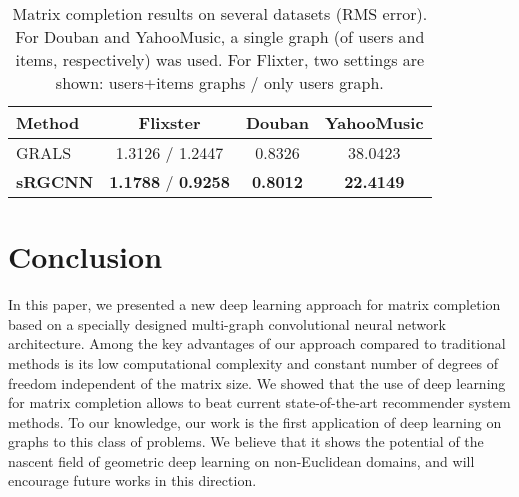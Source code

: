 \documentclass{article}
\begin{document}
\begin{table}[!h]
\caption{
Matrix completion results on several datasets (RMS error). For Douban and YahooMusic, a single graph (of users and items, respectively) was used. For Flixter, two settings are shown: users+items graphs / only users graph. \vspace{-2.25mm} 
}
\label{tab:other-datasets}
\vskip 0.15in
\begin{center}
\begin{small}
\begin{sc}
\begin{tabular}{lccc}
\hline
\abovespace\belowspace
Method & Flixster & Douban & YahooMusic \\
\hline
\abovespace 
GRALS & 1.3126 / 1.2447 & 0.8326 & 38.0423\\ 
{\bf sRGCNN} & {\bf 1.1788} / {\bf 0.9258} & {\bf 0.8012} & {\bf 22.4149} \\
\hline
\end{tabular}
\end{sc}
\end{small}
\end{center}
\end{table}













 


\section{Conclusion}
\label{sec:conc}

In this paper, we presented a new deep learning approach for matrix completion based on a specially designed multi-graph convolutional neural network architecture. Among the key advantages of our approach compared to traditional methods is its low computational complexity and constant number of degrees of freedom independent of the matrix size. We showed that the use of deep learning for matrix completion allows to beat current state-of-the-art recommender system methods. To our knowledge, our work is the first application of deep learning on graphs to this class of problems. We believe that it shows the potential of the nascent field of geometric deep learning on non-Euclidean domains, and will encourage future works in this direction. 

 
\end{document}
